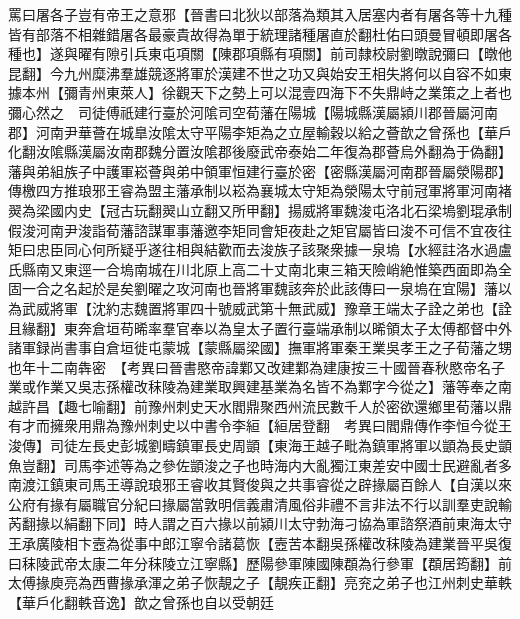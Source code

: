罵曰屠各子豈有帝王之意邪【晉書曰北狄以部落為類其入居塞内者有屠各等十九種皆有部落不相雜錯屠各最豪貴故得為單于統理諸種屠直於翻杜佑曰頭曼冒頓即屠各種也】遂與曜有隙引兵東屯項關【陳郡項縣有項關】前司隸校尉劉暾說彌曰【暾他昆翻】今九州糜沸羣雄競逐將軍於漢建不世之功又與始安王相失將何以自容不如東據本州【彌青州東萊人】徐觀天下之勢上可以混壹四海下不失鼎峙之業策之上者也彌心然之　司徒傅祇建行臺於河隂司空荀藩在陽城【陽城縣漢屬潁川郡晉屬河南郡】河南尹華薈在城臯汝隂太守平陽李矩為之立屋輸穀以給之薈歆之曾孫也【華戶化翻汝隂縣漢屬汝南郡魏分置汝隂郡後廢武帝泰始二年復為郡薈烏外翻為于偽翻】藩與弟組族子中護軍崧薈與弟中領軍恒建行臺於密【密縣漢屬河南郡晉屬滎陽郡】傳檄四方推琅邪王睿為盟主藩承制以崧為襄城太守矩為滎陽太守前冠軍將軍河南褚翜為梁國内史【冠古玩翻翜山立翻又所甲翻】揚威將軍魏浚屯洛北石梁塢劉琨承制假浚河南尹浚詣荀藩諮謀軍事藩邀李矩同會矩夜赴之矩官屬皆曰浚不可信不宜夜往矩曰忠臣同心何所疑乎遂往相與結歡而去浚族子該聚衆據一泉塢【水經註洛水過盧氏縣南又東逕一合塢南城在川北原上高二十丈南北東三箱天險峭絶惟築西面即為全固一合之名起於是矣劉曜之攻河南也晉將軍魏該奔於此該傳曰一泉塢在宜陽】藩以為武威將軍【沈約志魏置將軍四十號威武第十無武威】豫章王端太子詮之弟也【詮且緣翻】東奔倉垣苟晞率羣官奉以為皇太子置行臺端承制以晞領太子太傅都督中外諸軍録尚書事自倉垣徙屯蒙城【蒙縣屬梁國】撫軍將軍秦王業吳孝王之子荀藩之甥也年十二南犇密　【考異曰晉書愍帝諱鄴又改建鄴為建康按三十國晉春秋愍帝名子業或作業又吳志孫權改秣陵為建業取興建基業為名皆不為鄴字今從之】藩等奉之南越許昌【趣七喻翻】前豫州刺史天水閻鼎聚西州流民數千人於密欲還鄉里荀藩以鼎有才而擁衆用鼎為豫州刺史以中書令李絙【絙居登翻　考異曰閻鼎傳作李恒今從王浚傳】司徒左長史彭城劉疇鎮軍長史周顗【東海王越子毗為鎮軍將軍以顗為長史顗魚豈翻】司馬李述等為之參佐顗浚之子也時海内大亂獨江東差安中國士民避亂者多南渡江鎮東司馬王導說琅邪王睿收其賢俊與之共事睿從之辟掾屬百餘人【自漢以來公府有掾有屬職官分紀曰掾屬當敦明信義肅清風俗非禮不言非法不行以訓羣吏說輸芮翻掾以絹翻下同】時人謂之百六掾以前潁川太守勃海刁協為軍諮祭酒前東海太守王承廣陵相卞壼為從事中郎江寧令諸葛恢【壼苦本翻吳孫權改秣陵為建業晉平吳復曰秣陵武帝太康二年分秣陵立江寧縣】歷陽參軍陳國陳頵為行參軍【頵居筠翻】前太傅掾庾亮為西曹掾承渾之弟子恢靚之子【靚疾正翻】亮兖之弟子也江州刺史華軼【華戶化翻軼音逸】歆之曾孫也自以受朝廷

